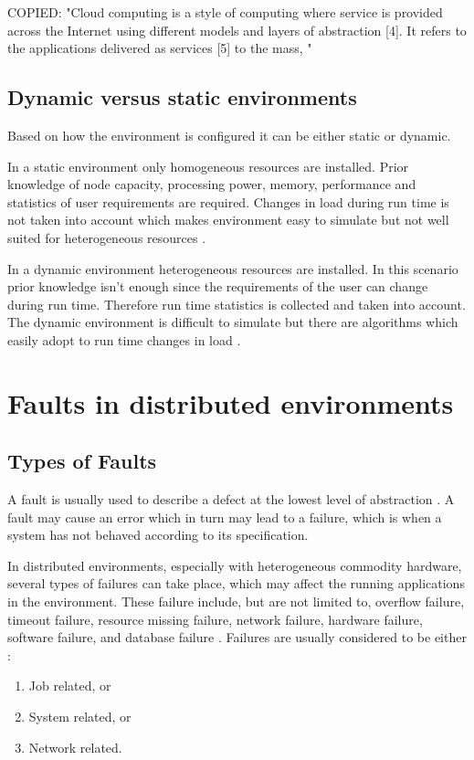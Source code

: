 \documentclass{cslthse-msc}
\begin{document}
COPIED: "Cloud computing is a style of computing where service is provided across the Internet using different models and layers of abstraction [4]. It refers to the applications delivered as services [5] to the mass, " \cite{faultToleranceChallenges}

\subsection{Dynamic versus static environments}
Based on how the environment is configured it can be either static or dynamic. 

In a static environment only homogeneous resources are installed. Prior knowledge of node capacity, processing power, memory, performance and statistics of user requirements are required. Changes in load during run time is not taken into account which makes environment easy to simulate but not well suited for heterogeneous resources \cite{compStudyLoadAndCloud}.

In a dynamic environment heterogeneous resources are installed. In this scenario prior knowledge isn't enough since the requirements of the user can change during run time. Therefore run time statistics is collected and taken into account. The dynamic environment is difficult to simulate but there are algorithms which easily adopt to run time changes in load \cite{compStudyLoadAndCloud}.


\section{Faults in distributed environments}
\subsection{Types of Faults}
A fault is usually used to describe a defect at the lowest level of abstraction \cite{faultTolerantFundamentals}. A fault may cause an error which in turn may lead to a failure, which is when a system has not behaved according to its specification.

In distributed environments, especially with heterogeneous commodity hardware, several types of failures can take place, which may affect the running applications in the environment. These failure include, but are not limited to, overflow failure, timeout failure, resource missing failure, network failure, hardware failure, software failure, and database failure \cite{cloudServiceRel}. Failures are usually considered to be either \cite{evalOfGridRel}:
\begin{enumerate}
	\item Job related, or
	\item System related, or
	\item Network related.
\end{enumerate}
\end{document}
